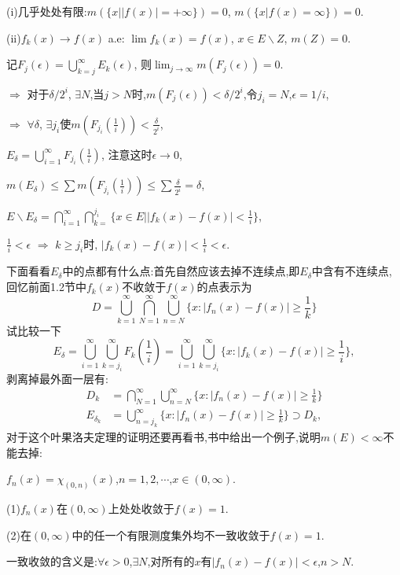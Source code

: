 \documentclass[12pt,a4paper,openany]{book}
\begin{document}
(i)几乎处处有限:$m(\{x | |f(x)| = +\infty\}) = 0$, $m(\{x | f(x) = \infty\}) = 0$.

(ii)$f_k(x) \rightarrow f(x)$ a.e: $\lim{f_k(x)} = f(x)$, $x \in E \backslash Z$, $m(Z) = 0$.

记$F_j(\epsilon) = \bigcup_{k=j}^{\infty}{E_k(\epsilon)}$, 则$\lim_{j \rightarrow \infty}{m(F_j(\epsilon))} = 0$. 

$\Rightarrow$ 对于$\delta/2^i$, $\exists N$,当$j > N$时,$m(F_j(\epsilon)) < \delta/2^i$,令$j_i=N$,$\epsilon=1/i$,

$\Rightarrow$ $\forall \delta$, $\exists j_i$使$m(F_{j_i}(\frac{1}{i})) < \frac{\delta}{2^i}$,

$E_{\delta} = \bigcup_{i=1}^{\infty}{F_{j_i}(\frac{1}{i})}$, 注意这时$\epsilon \rightarrow 0$,

$m(E_\delta) \le \sum{m(F_{j_i}(\frac{1}{i}))} \le \sum{\frac{\delta}{2^i}} = \delta$,

$E \backslash E_{\delta} = \bigcap_{i=1}^{\infty}{\bigcap_{k=}^{j_i}{\{x \in E | |f_k(x) - f(x)| < \frac{1}{i}\}}}$,

$\frac{1}{i} < \epsilon$ $\Rightarrow$ $k \ge j_i$时, $|f_k(x) - f(x)| < \frac{1}{i} < \epsilon$.

下面看看$E_{\delta}$中的点都有什么点:首先自然应该去掉不连续点,即$E_{\delta}$中含有不连续点, 回忆前面1.2节中$f_k(x)$不收敛于$f(x)$的点表示为
\[
D = \bigcup_{k=1}^{\infty}{\bigcap_{N=1}^{\infty}{\bigcup_{n=N}^{\infty}{\{x : |f_n(x) - f(x)| \ge \frac{1}{k}\}}}}
\]
试比较一下
\[
E_{\delta} = \bigcup_{i=1}^{\infty}{\bigcup_{k=j_i}^{\infty}{F_{k}(\frac{1}{i})}} = \bigcup_{i=1}^{\infty}{\bigcup_{k=j_i}^{\infty}{\{x:|f_k(x) - f(x)| \ge \frac{1}{i}\}}},
\]
剥离掉最外面一层有:
\[
\begin{aligned}
D_k &= \bigcap_{N=1}^{\infty}{\bigcup_{n=N}^{\infty}{\{x : |f_n(x) - f(x)| \ge \frac{1}{k}\}}} \\
E_{\delta_k} &= \bigcup_{n=j_k}^{\infty}{\{x:|f_n(x) - f(x)| \ge \frac{1}{k}\}} \supset D_k,
\end{aligned}
\]
对于这个叶果洛夫定理的证明还要再看书,书中给出一个例子,说明$m(E) < \infty$不能去掉:

$f_n(x) = \chi_{(0,n)}(x)$,$n=1,2,\cdots$,$x\in(0,\infty)$.

(1)$f_n(x)$在$(0,\infty)$上处处收敛于$f(x)=1$.

(2)在$(0,\infty)$中的任一个有限测度集外均不一致收敛于$f(x)=1$.

一致收敛的含义是:$\forall \epsilon>0$,$\exists N$,对所有的$x$有$|f_n(x)-f(x)|<\epsilon$,$n > N$.
\end{document}
